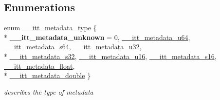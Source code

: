 \subsection*{Enumerations}
\begin{DoxyCompactItemize}
\item 
enum \hyperlink{group__metadata_ga906320efadd24c37fc2ee021e880a673}{\+\_\+\+\_\+itt\+\_\+metadata\+\_\+type} \{ \\*
{\bfseries \+\_\+\+\_\+itt\+\_\+metadata\+\_\+unknown} = 0, 
\hyperlink{group__metadata_gga906320efadd24c37fc2ee021e880a673a33754465ee8a15fc38270050a8f1eb03}{\+\_\+\+\_\+itt\+\_\+metadata\+\_\+u64}, 
\hyperlink{group__metadata_gga906320efadd24c37fc2ee021e880a673a2ea9b3d3305f3c79899bf2a6cc28c387}{\+\_\+\+\_\+itt\+\_\+metadata\+\_\+s64}, 
\hyperlink{group__metadata_gga906320efadd24c37fc2ee021e880a673aeb76f9ad9507657f720070824421d440}{\+\_\+\+\_\+itt\+\_\+metadata\+\_\+u32}, 
\\*
\hyperlink{group__metadata_gga906320efadd24c37fc2ee021e880a673a9d216a6e79c71de0fd411517a91a68c8}{\+\_\+\+\_\+itt\+\_\+metadata\+\_\+s32}, 
\hyperlink{group__metadata_gga906320efadd24c37fc2ee021e880a673a87743b7100995bca6b0677d05be50c62}{\+\_\+\+\_\+itt\+\_\+metadata\+\_\+u16}, 
\hyperlink{group__metadata_gga906320efadd24c37fc2ee021e880a673a3b3b5d18018461f2c27775dcf1421573}{\+\_\+\+\_\+itt\+\_\+metadata\+\_\+s16}, 
\hyperlink{group__metadata_gga906320efadd24c37fc2ee021e880a673a115d51bb4ac36b09afd93959c2758ff5}{\+\_\+\+\_\+itt\+\_\+metadata\+\_\+float}, 
\\*
\hyperlink{group__metadata_gga906320efadd24c37fc2ee021e880a673a01778ca21a498d0835db181289c605a3}{\+\_\+\+\_\+itt\+\_\+metadata\+\_\+double}
 \}\begin{DoxyCompactList}\small\item\em describes the type of metadata \end{DoxyCompactList}
\end{DoxyCompactItemize}
